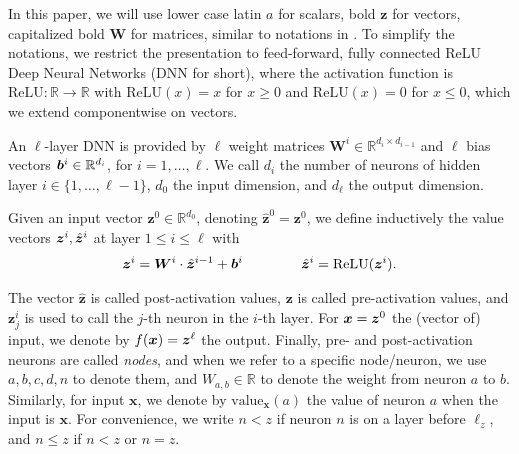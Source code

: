 \documentclass{llncs}
\newcommand{\val}{{\textrm{value}}}
\newcommand{\ReLU}{\mathrm{ReLU}}
\begin{document}
	In this paper, we will use lower case latin $a$ for scalars, bold $\boldsymbol{z}$ for vectors, 
	capitalized bold $\boldsymbol{W}$ for matrices, similar to notations in \cite{crown}.
	To simplify the notations, we restrict the presentation to feed-forward, 
	fully connected ReLU Deep Neural Networks (DNN for short), where the activation function is $\ReLU : \mathbb{R} \rightarrow \mathbb{R}$ with
	$\ReLU(x)=x$ for $x \geq 0$ and $\ReLU(x)=0$ for $x \leq 0$, which we extend componentwise on vectors.
	
	
	
	
	An $\ell$-layer DNN is provided by $\ell$ weight matrices 
	$\boldsymbol{W}^i \in \mathbb{R}^{d_i\times d_{i-1}}$
	and $\ell$ bias vectors ${\bm{b}}^i \in \mathbb{R}^{d_i}$, for $i=1, \ldots, \ell$.
	We call $d_i$ the number of neurons of hidden layer $i \in \{1, \ldots, \ell-1\}$,
	$d_0$ the input dimension, and $d_\ell$ the output dimension.
	
	Given an input vector $\boldsymbol{z}^0 \in \mathbb{R}^{d_0}$, 
	denoting $\hat{\boldsymbol{z}}^{0}={\boldsymbol{z}}^0$, we define inductively the value vectors $\boldsymbol{z}^i,\hat{{\bm{z}}}^i$ at layer $1 \leq i \leq \ell$ with
	\begin{align*}
		\boldsymbol{z}^{i} = \boldsymbol{W}^i\cdot \hat{\boldsymbol{z}}^{i-1}+ \vb^i \qquad \, \qquad
		\hat{\boldsymbol{z}}^{i} = \ReLU({\boldsymbol{z}}^i).
	\end{align*} 
	
	The vector $\hat{\boldsymbol{z}}$ is called post-activation values, 
	$\boldsymbol{z}$ is called pre-activation values, 
	and $\boldsymbol{z}^{i}_j$ is used to call the $j$-th neuron in the $i$-th layer. 
	For $\boldsymbol{x}={\bm{z}}^0$ the (vector of) input, we denote by $f(\boldsymbol{x})={\bm{z}}^\ell$ the output. Finally, pre- and post-activation neurons are called \emph{nodes}, and when we refer to a specific node/neuron, we use $a,b,c,d,n$ to denote them, and $W_{a,b} \in \mathbb{R}$ to denote the weight from neuron $a$ to $b$. Similarly, for input $\boldsymbol{x}$, we denote by $\val_{\boldsymbol{x}}(a)$ the value of neuron $a$ when the input is $\boldsymbol{x}$.	For convenience, we write $n < z$ if neuron $n$ is on a layer before $\ell_z$, and $n \leq z$ if $n< z$ or $n=z$.
	
\end{document}
